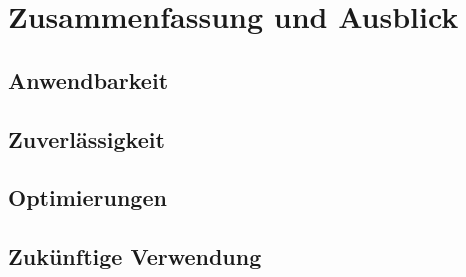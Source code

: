 
\chapter{Zusammenfassung und Ausblick}
\section{Anwendbarkeit}
\section{Zuverlässigkeit}
\section{Optimierungen}
\section{Zukünftige Verwendung}

